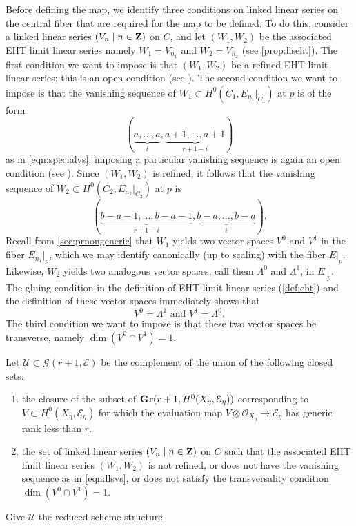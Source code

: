 \documentclass[11pt,reqno]{amsart}
\theoremstyle{plain}
\theoremstyle{definition}
\theoremstyle{remark}
\numberwithin{equation}{section}
\renewcommand{\to}{{\longrightarrow}}
\numberwithin{equation}{section}
\renewcommand{\O}{\mathcal O}
\begin{document}
Before defining the map, we identify three conditions on linked linear series on the central fiber that are required for the map to be defined.
To do this, consider a linked linear series $(V_n \mid n \in {\bf Z})$ on $C$, and let $(W_1, W_2)$ be the associated EHT limit linear series namely $W_1 = V_{n_1}$ and $W_2 = V_{n_2}$ (see \autoref{prop:llseht}).
The first condition we want to impose is that $(W_1, W_2)$ be a refined EHT limit linear series; this is an open condition (see \cite[Proposition~4.1.5]{oss:14}).
The second condition we want to impose is that the vanishing sequence of $W_1 \subset H^0(C_1, E_{n_1}|_{C_1})$ at $p$ is of the form
\begin{equation}\label{eqn:llsvs}
  (\underbrace{a, \dots, a}_i, \underbrace{a+1, \dots, a+1}_{r+1-i})
\end{equation}
as in \eqref{eqn:specialvs}; imposing a particular vanishing sequence is again an open condition (see \cite[Proposition~4.2.5]{oss:14}).
Since $(W_1, W_2)$ is refined, it follows that the vanishing sequence of $W_2 \subset H^0(C_2, E_{n_2}|_{C_2})$ at $p$ is
\[ (\underbrace{b-a-1, \dots, b-a-1}_{r+1-i}, \underbrace{b-a, \dots, b-a}_{i}).\]
Recall from \autoref{sec:prnongeneric} that $W_1$ yields two vector spaces $V^0$ and $V^1$ in the fiber $E_{n_1}|_p$, which we may identify canonically (up to scaling) with the fiber $E|_p$.
Likewise, $W_2$ yields two analogous vector spaces, call them $\Lambda^0$ and $\Lambda^1$, in $E|_p$.
The gluing condition in the definition of EHT limit linear series (\autoref{def:eht}) and the definition of these vector spaces immediately shows that
\begin{equation}\label{eqn:vlambdaswitch}
  V^0 = \Lambda^1 \text{ and } V^1 = \Lambda^0.
\end{equation}
The third condition we want to impose is that these two vector spaces be transverse, namely $\dim (V^0 \cap V^1) = 1$.

Let $\mathcal U \subset {\mathcal G}(r+1, \mathcal E)$ be the complement of the union of the following closed sets:
\begin{enumerate}
\item the closure of the subset of ${\bf Gr}(r+1, H^0(X_\eta, \mathcal E_\eta))$ corresponding to $V \subset H^0(X_\eta, \mathcal E_\eta)$ for which the evaluation map $V\otimes\O_{X_\eta} \to \mathcal E_\eta$ has generic rank less than $r$.
\item the set of linked linear series $(V_n \mid n \in {\bf Z})$ on $C$ such that the associated EHT limit linear series $(W_1, W_2)$ is not refined, or does not have the vanishing sequence as in \eqref{eqn:llsvs}, or does not satisfy the transversality condition $\dim (V^0 \cap V^1) = 1$.
\end{enumerate}
Give $\mathcal U$ the reduced scheme structure.
\end{document}
